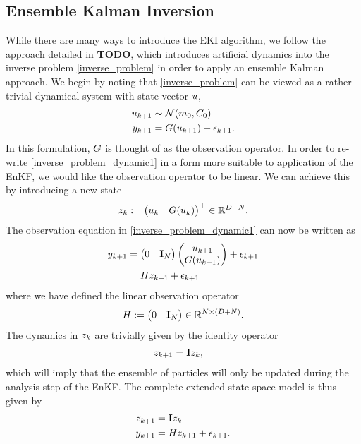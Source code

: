\documentclass[12pt]{article}
\begin{document}
\subsection{Ensemble Kalman Inversion}
While there are many ways to introduce the EKI algorithm, we follow the approach detailed in \textbf{TODO}, which introduces 
artificial dynamics into the inverse problem \ref{inverse_problem} in order to apply an ensemble Kalman approach. We begin 
by noting that \ref{inverse_problem} can be viewed as a rather trivial dynamical system with state vector $\spar$,
\begin{align}
\dpar[\timeStep+1] &\sim \Gaussian(\priorMean, \priorCov) \label{inverse_problem_dynamic1} \\
\indexTimeStep[\timeStep+1]{\dataObs} &= \fwd(\dpar[\timeStep+1]) + \indexTimeStep[\timeStep+1]{\noise}. \nonumber
\end{align}
In this formulation, $\fwd$ is thought of as the observation operator. In order to re-write \ref{inverse_problem_dynamic1}
in a form more suitable to application of the EnKF, we would like the observation operator to be linear. We can achieve this
by introducing a new state
\begin{align}
\dexState := \begin{pmatrix} \dpar & \fwd(\dpar) \end{pmatrix}^\top \in \R^{\Npar + \dimData}.
\end{align}
The observation equation in \ref{inverse_problem_dynamic1} can now be written as 
\begin{align*}
\indexTimeStep[\timeStep+1]{\dataObs} 
&= \begin{pmatrix} 0 & \idMat_{\dimData} \end{pmatrix} \begin{pmatrix} \dpar[\timeStep+1] \\ \fwd(\dpar[\timeStep+1]) \end{pmatrix} + \indexTimeStep[\timeStep+1]{\noise} \\
&= \obsOpLin \dexState[\timeStep+1] + \indexTimeStep[\timeStep+1]{\noise} 
\end{align*}
where we have defined the linear observation operator 
\begin{align}
\obsOpLin := \begin{pmatrix} 0 & \idMat_{\dimData} \end{pmatrix} \in \R^{\dimData \times (\Npar + \dimData)}.
\end{align}
The dynamics in $\dexState$ are trivially given by the identity operator 
\begin{align*}
\dexState[\timeStep+1] &= \idMat \dexState[\timeStep],
\end{align*}
which will imply that the ensemble of particles will only be updated during the analysis step of the EnKF. The complete extended state space
model is thus given by 
\begin{align}
\dexState[\timeStep+1] &= \idMat \dexState[\timeStep] \label{inverse_problem_dynamic} \\
\indexTimeStep[\timeStep+1]{\dataObs} &= \obsOpLin \dexState[\timeStep+1] + \indexTimeStep[\timeStep+1]{\noise} \nonumber.
\end{align}
\end{document}
